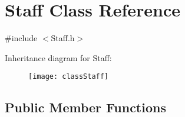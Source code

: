 \hypertarget{classStaff}{}\section{Staff Class Reference}
\label{classStaff}


{\ttfamily \#include $<$Staff.\+h$>$}

Inheritance diagram for Staff\+:\begin{figure}[H]
\begin{center}
\leavevmode
\texttt{[image: classStaff]}
\end{center}
\end{figure}
\subsection*{Public Member Functions}
